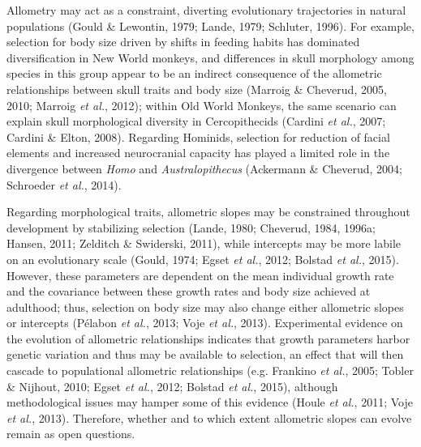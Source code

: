 \documentclass[12pt,twoside]{report}
\begin{document}
Allometry may act as a constraint, diverting evolutionary trajectories
in natural populations (Gould \& Lewontin, 1979; Lande, 1979; Schluter,
1996). For example, selection for body size driven by shifts in feeding
habits has dominated diversification in New World monkeys, and
differences in skull morphology among species in this group appear to be
an indirect consequence of the allometric relationships between skull
traits and body size (Marroig \& Cheverud, 2005, 2010; Marroig \emph{et
al.}, 2012); within Old World Monkeys, the same scenario can explain
skull morphological diversity in Cercopithecids (Cardini \emph{et al.},
2007; Cardini \& Elton, 2008). Regarding Hominids, selection for
reduction of facial elements and increased neurocranial capacity has
played a limited role in the divergence between \emph{Homo} and
\emph{Australopithecus} (Ackermann \& Cheverud, 2004; Schroeder \emph{et
al.}, 2014).

Regarding morphological traits, allometric slopes may be constrained
throughout development by stabilizing selection (Lande, 1980; Cheverud,
1984, 1996a; Hansen, 2011; Zelditch \& Swiderski, 2011), while
intercepts may be more labile on an evolutionary scale (Gould, 1974;
Egset \emph{et al.}, 2012; Bolstad \emph{et al.}, 2015). However, these
parameters are dependent on the mean individual growth rate and the
covariance between these growth rates and body size achieved at
adulthood; thus, selection on body size may also change either
allometric slopes or intercepts (Pélabon \emph{et al.}, 2013; Voje
\emph{et al.}, 2013). Experimental evidence on the evolution of
allometric relationships indicates that growth parameters harbor genetic
variation and thus may be available to selection, an effect that will
then cascade to populational allometric relationships (e.g. Frankino
\emph{et al.}, 2005; Tobler \& Nijhout, 2010; Egset \emph{et al.}, 2012;
Bolstad \emph{et al.}, 2015), although methodological issues may hamper
some of this evidence (Houle \emph{et al.}, 2011; Voje \emph{et al.},
2013). Therefore, whether and to which extent allometric slopes can
evolve remain as open questions.
\end{document}
